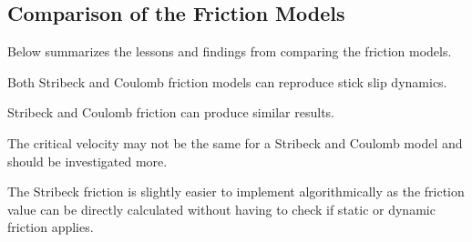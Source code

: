 \subsection{Comparison of the Friction Models}
Below summarizes the lessons and findings from comparing the friction models.
\begin{bulletedlist}
	\item Both Stribeck and Coulomb friction models can reproduce stick slip dynamics.
	\item Stribeck and Coulomb friction can produce similar results.
	\item The critical velocity may not be the same for a Stribeck and Coulomb model and should be investigated more.
	\item The Stribeck friction is slightly easier to implement algorithmically as the friction value can be directly calculated without having to check if static or dynamic friction applies.
\end{bulletedlist} 